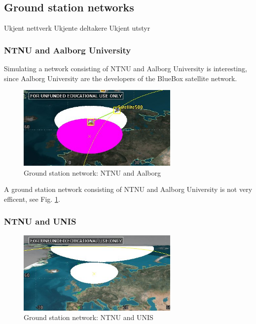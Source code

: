 \subsection{Ground station networks}

Ukjent nettverk
Ukjente deltakere
Ukjent utstyr



\subsubsection{NTNU and Aalborg University}
Simulating a network consisting of NTNU and Aalborg University is interesting, since Aalborg University are the developers of the BlueBox satellite network.
\begin{figure}
  \begin{center}
    \includegraphics[width=0.7\textwidth]{Figures/range_ntnu_aalborg}
  \end{center}
  \caption[NTNU Aalborg]{Ground station network: NTNU and Aalborg}
  \label{fig:range_ntnu_aalborg}
\end{figure}

A ground station network consisting of NTNU and Aalborg University is not very efficent, see Fig. \ref{fig:range_ntnu_aalborg}.

\subsubsection{NTNU and UNIS}
 
\begin{figure}
  \begin{center}
    \includegraphics[width=0.7\textwidth]{Figures/range_ntnu_svalbard}
  \end{center}
  \caption[NTNU Aalborg]{Ground station network: NTNU and UNIS}
  \label{fig:range_ntnu_unis}
\end{figure}